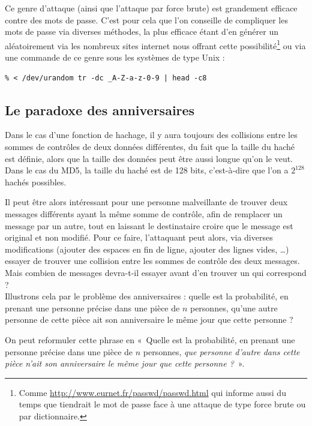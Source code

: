 Ce genre d'attaque (ainsi que l'attaque par force brute)
est grandement efficace contre des mots de passe. C'est
pour cela que l'on conseille de compliquer les mots de passe via
diverses méthodes, la plus efficace étant d'en générer un
aléatoirement via les nombreux sites internet nous offrant cette
possibilité\footnote{Comme
\url{http://www.eurnet.fr/passwd/passwd.html} qui informe aussi
du temps que tiendrait le mot de passe face à une attaque de type
force brute ou par dictionnaire.} ou via une commande de ce genre sous les systèmes
de type Unix :
\lstset{language=bash}
\begin{lstlisting}
% < /dev/urandom tr -dc _A-Z-a-z-0-9 | head -c8 
\end{lstlisting}

\subsection{Le paradoxe des anniversaires}
Dans le cas d'une fonction de hachage, il y aura toujours des
collisions entre les sommes de contrôles de deux données
différentes, du fait que la taille du haché est définie, alors que
la taille des données peut être aussi longue qu'on le veut.
Dans le cas du MD5, la taille du haché est de 128 bits,
c'est-à-dire que l'on a $2^{128}$ hachés possibles.

Il peut être alors intéressant pour une personne malveillante de
trouver deux messages différents ayant la même somme de contrôle,
afin de remplacer un message par un autre, tout en laissant le
destinataire croire que le message est original et non modifié. Pour ce
faire, l'attaquant peut alors, via diverses modifications (ajouter
des espaces en fin de ligne, ajouter des lignes vides, …) essayer
de trouver une collision entre les sommes de contrôle des deux
messages. Mais combien de messages devra-t-il essayer avant d'en
trouver un qui correspond ?
\\

Illustrons cela par le problème des anniversaires : quelle est la
probabilité, en prenant une personne précise dans une pièce de $n$
personnes, qu'une autre personne de cette pièce ait son
anniversaire le même jour que cette personne ?

On peut reformuler cette phrase en «~Quelle est la probabilité, en
prenant une personne précise dans une pièce de $n$ personnes,
\emph{que personne d'autre dans cette pièce n'ait son anniversaire
le même jour que cette personne ?}~».

